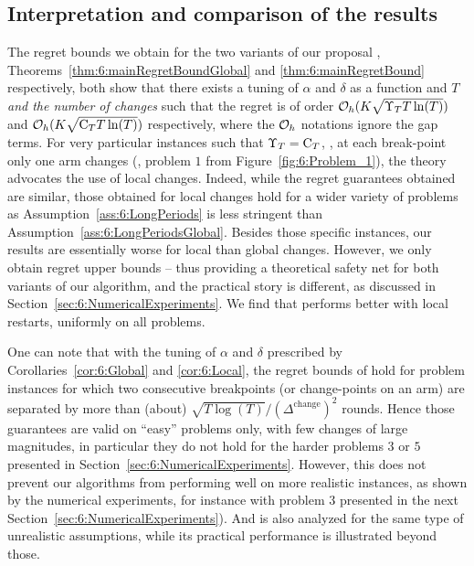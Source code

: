 \subsection{Interpretation and comparison of the results}
\label{sub:6:interpretationRegretBounds}

The regret bounds we obtain for the two variants of our proposal \GLRklUCB{},
Theorems~\ref{thm:6:mainRegretBoundGlobal} and \ref{thm:6:mainRegretBound} respectively,
both show that there exists a tuning of $\alpha$ and $\delta$ as a function and $T$ \emph{and the number of changes} such that the regret is of order $\mathcal{O}_h(K\sqrt{\Upsilon_T T \ln(T)})$ and $\mathcal{O}_h(K\sqrt{\mathrm{C}_T T \ln(T)})$ respectively, where the $\mathcal{O}_h$ notations ignore the gap terms.
%
For very particular instances such that $\Upsilon_T = \mathrm{C}_T$, \ie, at each break-point only one arm changes (\eg, problem $1$ from Figure~\ref{fig:6:Problem_1}), the theory advocates the use of local changes.
%
Indeed, while the regret guarantees obtained are similar, those obtained for local changes hold for a wider variety of problems as Assumption~\ref{ass:6:LongPeriods} is less stringent than Assumption~\ref{ass:6:LongPeriodsGlobal}.
%
Besides those specific instances, our results are essentially worse for local than global changes. However, we only obtain regret upper bounds -- thus providing a theoretical safety net for both variants of our algorithm, and the practical story is different, as discussed in Section~\ref{sec:6:NumericalExperiments}.
We find that \GLRklUCB{} performs better with local restarts, uniformly on all problems.

One can note that with the tuning of $\alpha$ and $\delta$ prescribed by Corollaries~\ref{cor:6:Global} and \ref{cor:6:Local}, the regret bounds of \GLRklUCB{} hold for problem instances for which two consecutive breakpoints (or change-points on an arm) are separated by more than (about) $\sqrt{T\log(T)}/(\Delta^{\text{change}})^2$ rounds.
Hence those guarantees are valid on ``easy'' problems only, with few changes of large magnitudes, in particular they do not hold for the harder problems $3$ or $5$ presented in Section~\ref{sec:6:NumericalExperiments}.
%
However, this does not prevent our algorithms from performing well on more realistic instances, as shown by the numerical experiments,
for instance with problem $3$ presented in the next Section~\ref{sec:6:NumericalExperiments}).
%
And \MUCB{} \cite{CaoZhenKvetonXie18} is also analyzed for the same type of unrealistic assumptions, while its practical performance is illustrated beyond those.


